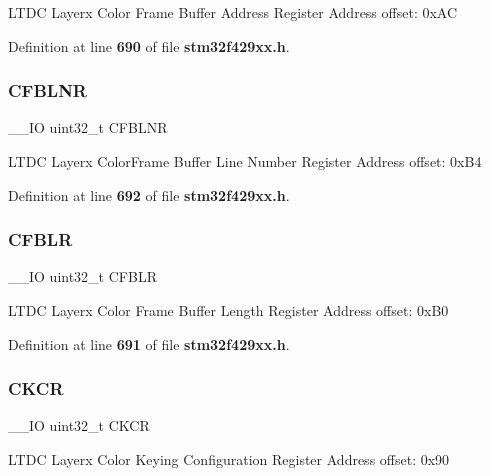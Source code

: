 L\+T\+DC Layerx Color Frame Buffer Address Register Address offset\+: 0x\+AC 

Definition at line \textbf{ 690} of file \textbf{ stm32f429xx.\+h}.

\mbox{\label{structLTDC__Layer__TypeDef_ad94a5782e5cc67b071738f8096bb4855}} 
\subsubsection{C\+F\+B\+L\+NR}
{\footnotesize\ttfamily \+\_\+\+\_\+\+IO uint32\+\_\+t C\+F\+B\+L\+NR}

L\+T\+DC Layerx Color\+Frame Buffer Line Number Register Address offset\+: 0x\+B4 

Definition at line \textbf{ 692} of file \textbf{ stm32f429xx.\+h}.

\mbox{\label{structLTDC__Layer__TypeDef_a1c2a59fc9bb4101881c7ddc98b938a4f}} 
\subsubsection{C\+F\+B\+LR}
{\footnotesize\ttfamily \+\_\+\+\_\+\+IO uint32\+\_\+t C\+F\+B\+LR}

L\+T\+DC Layerx Color Frame Buffer Length Register Address offset\+: 0x\+B0 

Definition at line \textbf{ 691} of file \textbf{ stm32f429xx.\+h}.

\mbox{\label{structLTDC__Layer__TypeDef_a7651be3d835a984e908b0abb4a633811}} 
\subsubsection{C\+K\+CR}
{\footnotesize\ttfamily \+\_\+\+\_\+\+IO uint32\+\_\+t C\+K\+CR}

L\+T\+DC Layerx Color Keying Configuration Register Address offset\+: 0x90 


